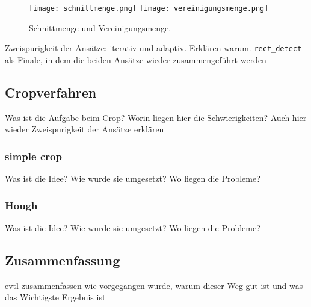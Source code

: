 \begin{figure}[h!]
\texttt{[image: schnittmenge.png]}
\texttt{[image: vereinigungsmenge.png]}
\caption{Schnittmenge und Vereinigungsmenge.}
\label{fig:jaccard}
\end{figure}

Zweispurigkeit der Ansätze: iterativ und adaptiv. Erklären warum.
\verb|rect_detect| als Finale, in dem die beiden Ansätze wieder zusammengeführt werden

\subsection{Cropverfahren}

Was ist die Aufgabe beim Crop?
Worin liegen hier die Schwierigkeiten?
Auch hier wieder Zweispurigkeit der Ansätze erklären

\subsubsection{simple crop}

Was ist die Idee?
Wie wurde sie umgesetzt?
Wo liegen die Probleme?

\subsubsection{Hough}

Was ist die Idee?
Wie wurde sie umgesetzt?
Wo liegen die Probleme?

\subsection{Zusammenfassung}
evtl zusammenfassen wie vorgegangen wurde, warum dieser Weg gut ist und was das Wichtigste Ergebnis ist